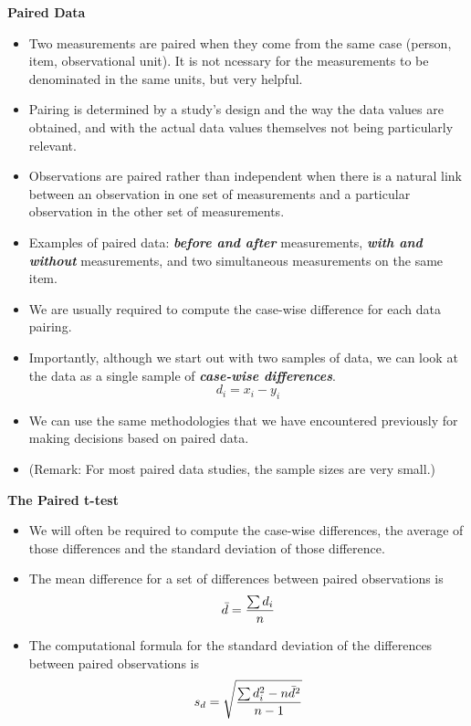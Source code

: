 \documentclass[a4paper,12pt]{article}
\begin{document}
\large 


\noindent \textbf{Paired Data}
\begin{itemize}
\item Two measurements are paired when they come from the same case (person, item, observational unit). It is not ncessary for the measurements to be denominated in the same units, but very helpful.
\item Pairing is determined by a study's design and the way the data values are obtained, and with the actual data values themselves not being particularly relevant. 
\item Observations are paired rather than independent when there is a natural link between an observation in one set of measurements and a particular observation in the other set of measurements.
\item Examples of paired data: \textit{\textbf{before and after}} measurements,\textit{ \textbf{with and without}} measurements, and two simultaneous measurements on the same item.
\end{itemize}


\bigskip 
\begin{itemize}
\item We are usually required to compute the case-wise difference for each data pairing.
\item Importantly, although we start out with two samples of data, we can look at the data as a single sample of \textit{\textbf{case-wise differences}}.
\[d_i = x_i-y_i\]
\item We can use the same methodologies that we have encountered previously for making decisions based on paired data.
\item (Remark: For most paired data studies, the sample sizes are very small.)
\end{itemize}


\newpage 
\noindent \textbf{The Paired t-test}
\begin{itemize}
\item We will often be required to compute the case-wise differences, the average of those differences and the standard deviation of those difference.

\item The mean difference for a set of differences between paired observations is
\[ \bar{d} = {\sum d_i \over n }\]

\item The computational formula for the standard deviation of the differences
between paired observations is
\[s_d = \sqrt{ {\sum d_i^2 - n\bar{d}^2 \over n-1}}\]
\end{itemize}
\end{document}
